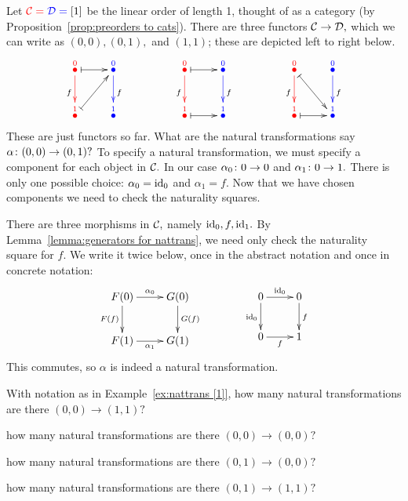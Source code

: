 \documentclass[CT4S-EN-RU]{subfiles}
\begin{document}
\begin{proofRUS}
\end{proofRUS}

\begin{exampleENG}\label{ex:nattrans [1]}
Let $\color{red}{\mathcal{C}}=\color{blue}{\mathcal{D}}=\color{black}{[1]}$ be the linear order of length 1, thought of as a category (by Proposition~\ref{prop:preorders to cats}). There are three functors $\mathcal{C}\rightarrow\mathcal{D},$ which we can write as $(0,0), (0,1),$ and $(1,1)$; these are depicted left to right below.
$$\xymatrix{
\LMO{\color{red}{0}}\ar@{|->}[r]\ar@[red][d]_f&\LMO{\color{blue}{0}}\ar@[blue][d]^f&&\LMO{\color{red}{0}}\ar@{|->}[r]\ar@[red][d]_f&\LMO{\color{blue}{0}}\ar@[blue][d]^f&&\LMO{\color{red}{0}}\ar@{|->}[dr]\ar@[red][d]_f&\LMO{\color{blue}{0}}\ar@[blue][d]^f\\
\LMO{\color{red}{1}}\ar@{|->}[ur]&\LMO{\color{blue}{1}}&&\LMO{\color{red}{1}}\ar@{|->}[r]&\LMO{\color{blue}{1}}&&\LMO{\color{red}{1}}\ar@{|->}[r]&\LMO{\color{blue}{1}}
}
$$
These are just functors so far. What are the natural transformations say $\alpha\colon (0,0)\rightarrow(0,1)?$ To specify a natural transformation, we must specify a component for each object in $\mathcal{C}.$ In our case $\alpha_0\colon 0\rightarrow 0$ and $\alpha_1\colon 0\rightarrow 1.$ There is only one possible choice: $\alpha_0=\textnormal{id}_0$ and $\alpha_1=f.$ Now that we have chosen components we need to check the naturality squares. 

There are three morphisms in $\mathcal{C},$ namely $\textnormal{id}_0, f, \textnormal{id}_1.$ By Lemma~\ref{lemma:generators for nattrans}, we need only check the naturality square for $f.$ We write it twice below, once in the abstract notation and once in concrete notation:
$$
\xymatrix{
F(0)\ar[r]^{\alpha_0}\ar[d]_{F(f)}&G(0)\ar[d]^{G(f)}\\
F(1)\ar[r]_{\alpha_1}&G(1)
}\hspace{.5in}
\xymatrix{
0\ar[r]^{\id_0}\ar[d]_{\id_0}&0\ar[d]^{f}\\
0\ar[r]_{f}&1
}
$$
This commutes, so $\alpha$ is indeed a natural transformation.
\end{exampleENG}

\begin{exampleRUS}\label{ex:nattrans [1]}
\end{exampleRUS}

\begin{exerciseENG}
With notation as in Example~\ref{ex:nattrans [1]},
\sexc how many natural transformations are there $(0,0)\to (1,1)?$
\item how many natural transformations are there $(0,0)\to (0,0)?$
\item how many natural transformations are there $(0,1)\to (0,0)?$
\item how many natural transformations are there $(0,1)\to (1,1)?$
\endsexc
\end{exerciseENG}
\end{document}
